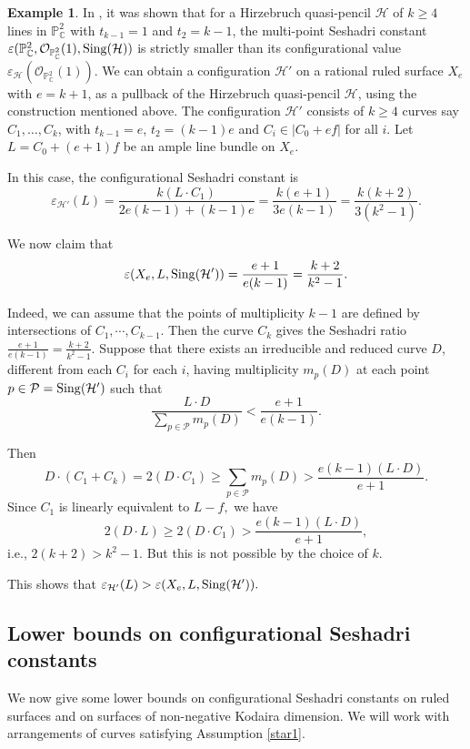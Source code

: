 \documentclass[12pt,reqno]{amsart}
\theoremstyle{plain}
\numberwithin{equation}{section}
\theoremstyle{definition}
\newtheorem{example}[theorem]{Example}
\begin{document}
\begin{example}
In \cite[Example 3.1]{JP}, it was shown that for a Hirzebruch quasi-pencil $\mathcal{H}$ of $k\geq 4$ lines in $\mathbb{P}^2_{\mathbb{C}}$ with $t_{k-1}=1$ and $t_2=k-1$, the multi-point Seshadri constant $\varepsilon(\mathbb{P}^2_{\mathbb{C}}, \mathcal{O}_{\mathbb{P}^2_{\mathbb{C}}}(1),{\rm Sing}(\mathcal{H}))$ is strictly smaller than its configurational value $\varepsilon_{\mathcal{H}}(\mathcal{O}_{\mathbb{P}^2_{\mathbb{C}}}(1)).$ We can obtain a configuration $\mathcal{H}'$ on a rational ruled surface $X_e$ with $e=k+1$, as a pullback of the Hirzebruch quasi-pencil $\mathcal{H}$, using the construction mentioned above. The configuration $\mathcal{H}'$ consists of $k \geq 4$ curves say $C_{1}, \ldots, C_{k}$, with $t_{k-1}=e$, $t_2=(k-1)e$ and $ C_i \in |C_0+ef|$ for all $i.$ Let $L=C_0+(e+1)f$ be an ample line bundle on $X_e.$ 

In this case, the configurational Seshadri constant is 
	$$	\varepsilon_{\mathcal{H}'}(L)= \frac{k(L\cdot C_1)}{2e(k-1)+(k-1)e}= \frac{k(e+1)}{3e(k-1)}=\frac{k(k+2)}{3(k^2-1)}.$$

We now claim that 
	$$\varepsilon(X_e, L,{\rm Sing}(\mathcal{H}')) = \frac{e+1}{e(k-1)}=\frac{k+2}{k^2-1}.$$ 
	
	Indeed, we can assume that the points of multiplicity $k-1$ are defined by intersections of $C_1, \cdots, C_{k-1}$. Then the curve $C_k$ gives the Seshadri ratio $\frac{e+1}{e(k-1)}=\frac{k+2}{k^2-1}.$  Suppose that there exists an irreducible and reduced curve $D$, different from each $C_{i}$ for each $i$, having multiplicity $m_{p}(D)$ at each point $p \in \mathcal{P}={\rm Sing}(\mathcal{H}')$ such that
	\begin{equation*}
		\frac{L \cdot D}{\sum_{p \in \mathcal{P}} m_{p}(D)} < \frac{e+1}{e(k-1)}.		
\end{equation*}

Then 
$$D \cdot (C_1+C_k)=2 (D \cdot C_1) \geq \sum_{p \in \mathcal{P}} m_{p}(D) > \frac{e(k-1)(L \cdot D)}{e+1}.$$
Since $C_1$ is linearly equivalent to $L-f, $ we have $$2(D \cdot L) \geq 2(D \cdot C_{1})> \frac{e(k-1)(L \cdot D)}{e+1},$$ i.e., 
$2(k+2) > k^2-1.$ But this is not possible by the choice of $k$. 

	
	
	
	This shows that $\varepsilon_{\mathcal{H}'}(L) > \varepsilon(X_e, L,{\rm Sing}(\mathcal{H}')).$
\end{example}



\subsection{Lower bounds on configurational Seshadri constants}\label{bounds}
We now give some lower bounds on configurational Seshadri constants on ruled surfaces and on surfaces of non-negative Kodaira dimension.	We will 
work with arrangements of curves satisfying Assumption \ref{star1}. 
\end{document}
